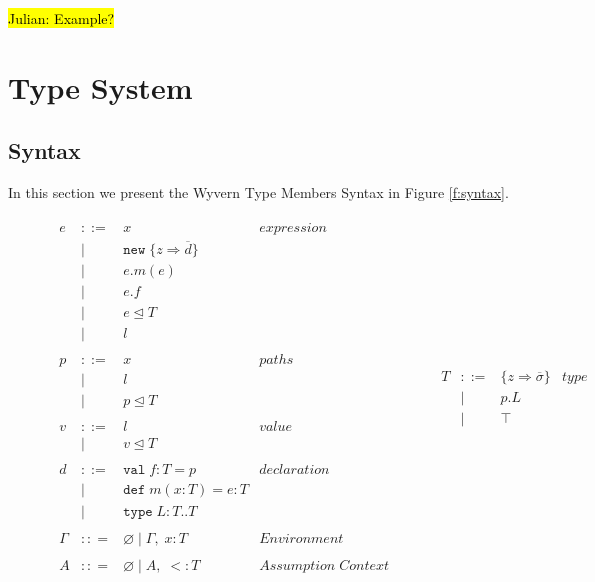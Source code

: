 \documentclass[11pt
              , a4paper
              , twoside
              , openright
              ]{report}
\begin{document}
\hl{Julian: Example?}


\section{Type System}

\subsection{Syntax} \label{s:syntax}
In this section we present the Wyvern Type Members Syntax 
in Figure \ref{f:syntax}. 

\begin{figure}[h]
\[
\begin{array}{lll}
\begin{array}{lllr}
e & ::= & x & expression \\
& | & \texttt{new} \; \{z \Rightarrow \overline{d}\}&\\
& | & e.m(e) &\\
& | & e.f &\\
& | & e \unlhd T&\\
& | & l &\\
&&\\
p & ::= & x & paths \\
& | & l &\\
& | & p \unlhd T &\\
&&\\
v & ::= & l & value \\
& | & v \unlhd T &\\
&&\\
d & ::= & \texttt{val} \; f : T = p & declaration \\
  & |   & \texttt{def} \; m(x:T) = e : T &\\
  & |   & \texttt{type} \; L : T .. T&\\
&&\\
\Gamma & :: = & \varnothing \; | \; \Gamma,\; x : T & Environment \\
&&\\
A & :: = & \varnothing \; | \; A,\;  <: T & Assumption \; Context \\
 \end{array}
& ~~~~~~
&
\begin{array}{lllr}
T & ::= & \{z \Rightarrow \overline{\sigma}\} & type \\
& | & p.L &\\
& | & \top & \\

\end{array}
\end{array}\]
\end{figure}
\end{document}
